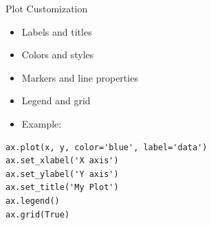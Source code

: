 \documentclass{beamer}
\begin{document}
\begin{frame}[fragile]{Plot Customization}
    \begin{itemize}
        \item Labels and titles
        \item Colors and styles
        \item Markers and line properties
        \item Legend and grid
        \item Example:
    \end{itemize}

\begin{lstlisting}
ax.plot(x, y, color='blue', label='data')
ax.set_xlabel('X axis')
ax.set_ylabel('Y axis')
ax.set_title('My Plot')
ax.legend()
ax.grid(True)
\end{lstlisting}
\end{frame}
\end{document}
